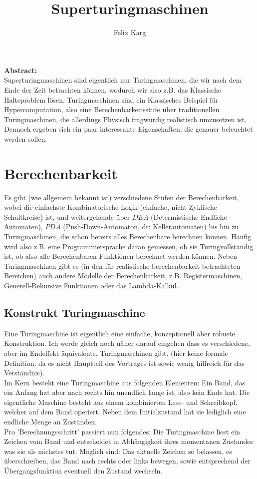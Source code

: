 \documentclass{scrartcl}
\title{Superturingmaschinen}
\author{Felix Karg}
\begin{document}
\maketitle

\textbf{\large {Abstract:} } \\
Superturingmaschinen sind eigentlich nur Turingmaschinen, die wir nach dem Ende
der Zeit betrachten können, wodurch wir also z.B. das Klassische Halteproblem
lösen. Turingmaschinen sind ein Klassisches Beispiel für Hypercomputation, also
eine Berechenbarkeitsstufe über traditionellen Turingmaschinen, die allerdings
Physisch fragwürdig realistisch umzusetzen ist. Dennoch ergeben sich ein paar
interessante Eigenschaften, die genauer beleuchtet werden sollen.


\section{Berechenbarkeit}
Es gibt (wie allgemein bekannt ist) verschiedene Stufen der Berechenbarkeit,
wobei die einfachste Kombinatorische Logik (einfache, nicht-Zyklische
Schaltkreise) ist, und weitergehende über $DEA$ (Determistische Endliche
Automaten), $PDA$ (Push-Down-Automaton, dt: Kellerautomaten)
bis hin zu Turingmaschinen, die schon bereits alles Berechenbare berechnen
können. Häufig wird also z.B. eine Programmiersprache daran gemessen, ob sie
Turingvollständig ist, ob also alle Berechenbaren Funktionen berechnet werden
können. Neben Turingmaschinen gibt es (in den für realistische berechenbarkeit
betrachteten Bereichen) auch andere Modelle der Berechenbarkeit, z.B.
Registermaschinen, Generell-Rekursive Funktionen oder das Lambda-Kalkül.


\subsection{Konstrukt Turingmaschine}
Eine Turingmaschine ist eigentlich eine einfache, konzeptionell aber
robuste Konstruktion. Ich werde gleich noch näher darauf eingehen dass es
verschiedene, aber im Endeffekt äquivalente, Turingmaschinen gibt. (hier keine
formale Definition, da es nicht Hauptteil des Vortrages ist sowie wenig
hilfreich für das Verständnis). \\
Im Kern besteht eine Turingmaschine aus folgenden Elementen: Ein Band, das
ein Anfang hat aber nach rechts hin unendlich lange ist, also kein Ende hat.
Die eigentliche Maschine besteht aus einem kombinierten Lese- und Schreibkopf,
welcher auf dem Band operiert. Neben dem Initialzustand hat sie lediglich eine
endliche Menge an Zuständen. \\
Pro 'Berechnungsschritt'
passiert nun folgendes: Die Turingmaschine liest ein Zeichen vom Band und
entscheidet in Abhängigkeit ihres momentanen Zustandes was sie als nächstes tut.
Möglich sind: Das aktuelle Zeichen so belassen, es überschreiben, das Band nach
rechts oder links bewegen, sowie entsprechend der Übergangsfunktion eventuell
den Zustand wechseln.
\end{document}
